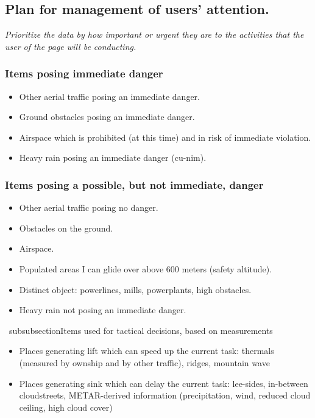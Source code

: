 \documentclass{article}
\newcommand{\myquote}[1]
{
	\textit{#1}
}
\begin{document}
\subsection{Plan for management of users' attention.}
\myquote{Prioritize the data by how important or urgent they are to the activities that the user of the page will be conducting.}

\subsubsection{Items posing immediate danger}
\begin{itemize}
\item Other aerial traffic posing an immediate danger.
\item Ground obstacles posing an immediate danger.
\item Airspace which is prohibited (at this time) and in risk of immediate violation.
\item Heavy rain posing an immediate danger (cu-nim).
\end{itemize}

\subsubsection{Items posing a possible, but not immediate, danger}
\begin{itemize}
\item Other aerial traffic posing no danger.
\item Obstacles on the ground.
\item Airspace.
\item Populated areas I can glide over above 600 meters (safety altitude).
\item Distinct object: powerlines, mills, powerplants, high obstacles.
\item Heavy rain not posing an immediate danger.
\end{itemize}

\ subsubsection{Items used for tactical decisions, based on measurements}
\begin{itemize}
\item Places generating lift which can speed up the current task: thermals
	(measured by ownship and by other traffic), ridges, mountain wave
\item Places generating sink which can delay the current task: lee-sides,
	in-between cloudstreets, METAR-derived information (precipitation, wind,
	 reduced cloud ceiling, high cloud cover)
\end{itemize}
\end{document}
